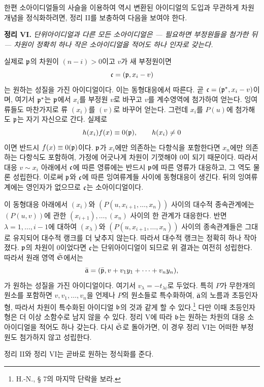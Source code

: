 한편 소아이디얼들의 사슬을 이용하여 역시 변환된 아이디얼의 도입과 무관하게 차원개념을 정식화하려면, 정리 II를 보충하여 다음을 보여야 한다.

\textbf{정리 VI.} \emph{단위아이디얼과 다른 모든 소아이디얼은 --- 필요하면 부정원들을 첨가한 뒤 --- 차원이 정확히 하나 작은 소아이디얼을 적어도 하나 인자로 갖는다.}

실제로 \(\mathfrak p\)의 차원이 \((n-i)>0\)이고 \(v\)가 새 부정원이면
\[
 \mathfrak c=(\mathfrak p,x_i-v)
\]
는 원하는 성질을 가진 아이디얼이다. 이는 동형대응에서 따른다. 곧 \(\mathfrak c=(\mathfrak p^*,x_i-v)\)이며, 여기서 \(\mathfrak p^*\)는 \(\mathfrak p\)에서 \(x_i\)를 부정원 \(v\)로 바꾸고 \(v\)를 계수영역에 첨가하여 얻는다. 잉여류들도 마찬가지로 류 \((x_i)\)를 \((v)\)로 바꾸어 얻는다. 그런데 \(x_i\)를 \(P(u)\)에 첨가해도 \(\mathfrak p\)는 자기 자신으로 간다. 실제로
\[
 h(x_i)f(x)\equiv0(\mathfrak p),\qquad h(x_i)\ne0
\]
이면 반드시 \(f(x)\equiv0(\mathfrak p)\)이다. \(\mathfrak p\)가 \(x_i\)에만 의존하는 다항식을 포함한다면 \(x_n\)에만 의존하는 다항식도 포함하여, 가정에 어긋나게 차원이 기껏해야 0이 되기 때문이다. 따라서 대응 \(v\sim x_i\) 아래에서 \(\mathfrak c\)에 따른 영류에는 반드시 \(\mathfrak p\)에 따른 영류가 대응하고, 그 역도 물론 성립한다. 이로써 \(\mathfrak p\)와 \(\mathfrak c\)에 따른 잉여류계들 사이에 동형대응이 생긴다. 뒤의 잉여류계에는 영인자가 없으므로 \(\mathfrak c\)는 소아이디얼이다.

이 동형대응 아래에서 \((x_i)\)와 \((P(u,x_{i+1},\ldots,x_n))\) 사이의 대수적 종속관계에는 \((P(u,v))\)에 관한 \((x_{i+1}),\ldots,(x_n)\) 사이의 한 관계가 대응한다. 반면 \(\lambda=1,\ldots,i-1\)에 대하여 \((x_\lambda)\)와 \((P(u,x_{i+1},\ldots,x_n))\) 사이의 종속관계들은 그대로 유지되어 대수적 랭크를 더 낮추지 않는다. 따라서 대수적 랭크는 정확히 하나 작아졌다. \(\mathfrak p\)의 차원이 0이었다면 \(\mathfrak c\)는 단위아이디얼이 되므로 위 결과는 여전히 성립한다. 따라서 원래 영역 \(\bar{\mathfrak S}\)에서는
\[
 \bar{\mathfrak a}=(\bar{\mathfrak p},v+v_1y_1+\cdots+v_ny_n),
\]
가 원하는 성질을 가진 아이디얼이다. 여기서 \(v_\lambda=-t_{\lambda i}\)로 두었다. 특히 \(P\)가 무한개의 원소를 포함하면 \(v,v_1,\ldots,v_n\)을 언제나 \(P\)의 원소들로 특수화하여, \(\bar{\mathfrak a}\)의 노름과 초등인자형, 따라서 차원이 특수화된 아이디얼 \(\mathfrak b\)의 것과 같게 할 수 있다.\footnote{H.-N., § 7의 마지막 단락을 보라.} 다만 이때 초등인자형은 더 이상 소함수로 남지 않을 수 있다. 정리 V에 따라 \(\mathfrak b\)는 원하는 차원의 대응 소아이디얼을 적어도 하나 갖는다. 다시 \(\bar{\mathfrak S}\)로 돌아가면, 이 경우 정리 VI는 어떠한 부정원도 첨가하지 않고 성립한다.

정리 II와 정리 VI는 곧바로 원하는 정식화를 준다.

